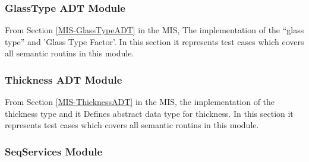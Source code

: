 \documentclass[12pt]{article}
\begin{document}
\subsubsection{GlassType ADT Module}	
From Section \ref{MIS-GlassTypeADT} in the MIS, The implementation of the ``glass type'' and 'Glass Type Factor'. In this section it represents test cases which covers all semantic routins in this module.

\subsubsection{Thickness ADT Module}	
From Section \ref{MIS-ThicknessADT} in the MIS, the implementation of the thickness type and it Defines abstract data type for thickness. In this section it represents test cases which covers all semantic routins in this module.

	
\subsubsection{SeqServices Module}
\end{document}
